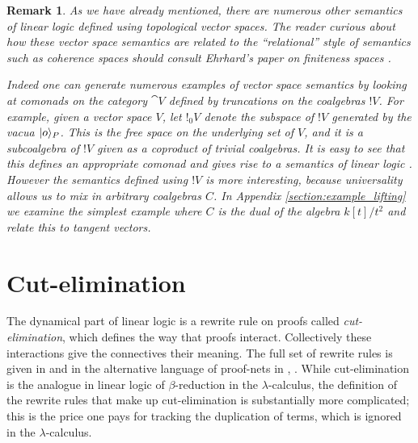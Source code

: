 \documentclass[english,letter paper,12pt,reqno]{article}
\DeclarePairedDelimiter\ket{\lvert}{\rangle}
\theoremstyle{example}
\newtheorem{remark}[theorem]{Remark}
\numberwithin{equation}{section}
\begin{document}
\begin{remark}\label{remark_otherpromotion} As we have already mentioned, there are numerous other semantics of linear logic defined using topological vector spaces. The reader curious about how these vector space semantics are related to the ``relational'' style of semantics such as coherence spaces should consult Ehrhard's paper on finiteness spaces \cite{ehrhard}.

Indeed one can generate numerous examples of vector space semantics by looking at comonads on the category $\cat{V}$ defined by truncations on the coalgebras ${!} V$. For example, given a vector space $V$, let ${!}_0 V$ denote the subspace of ${!} V$ generated by the vacua $\ket{o}_P$. This is the free space on the underlying \emph{set} of $V$, and it is a subcoalgebra of ${!} V$ given as a coproduct of trivial coalgebras. It is easy to see that this defines an appropriate comonad and gives rise to a semantics of linear logic \cite[\S 4.3]{valiron}. However the semantics defined using ${!} V$ is more interesting, because universality allows us to mix in arbitrary coalgebras $C$. In Appendix \ref{section:example_lifting} we examine the simplest example where $C$ is the dual of the algebra $k[t]/t^2$ and relate this to tangent vectors.
\end{remark}

\section{Cut-elimination}\label{section:cut_elim}

The dynamical part of linear logic is a rewrite rule on proofs called \emph{cut-elimination}, which defines the way that proofs interact. Collectively these interactions give the connectives their meaning. The full set of rewrite rules is given in \cite[Section 3]{mellies} and in the alternative language of proof-nets in \cite[\S 4]{girard_llogic}, \cite[p.18]{pagani}. While cut-elimination is the analogue in linear logic of $\beta$-reduction in the $\lambda$-calculus, the definition of the rewrite rules that make up cut-elimination is substantially more complicated; this is the price one pays for tracking the duplication of terms, which is ignored in the $\lambda$-calculus.
\end{document}
